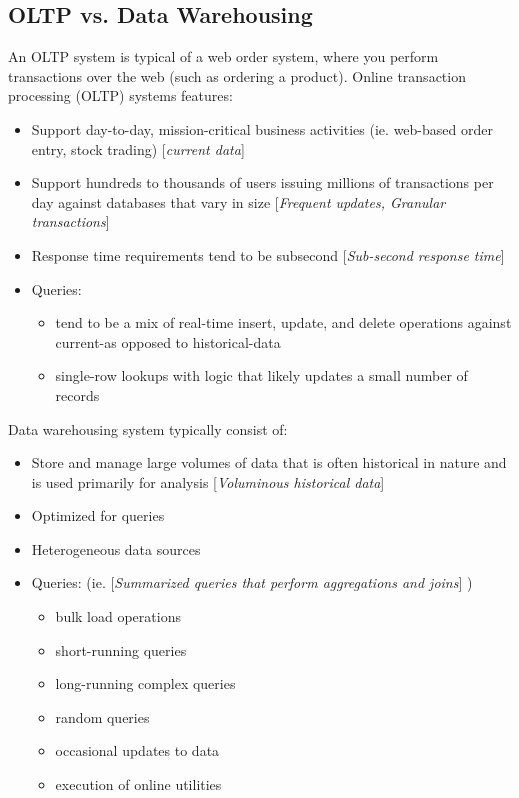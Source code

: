 \documentclass{article}
\begin{document}
\subsection{OLTP vs. Data Warehousing}
\label{oltp vs. data warehousing}

An OLTP system is typical of a web order system, where you perform transactions over the web
(such as ordering a product). Online transaction processing (OLTP) systems features:

\begin{itemize}
\item Support day-to-day, mission-critical business activities (ie. web-based order entry, stock trading)
[\textit{current data}]
\item Support hundreds to thousands of users issuing millions of transactions per day
against databases that vary in size [\textit{Frequent updates, Granular transactions}]
\item Response time requirements tend to be subsecond [\textit{Sub-second response time}]
\item Queries:
\begin{itemize}
\item tend to be a mix of real-time insert, update, and delete
operations against current-as opposed to historical-data
\item single-row lookups with logic that likely updates a small number of records
\end{itemize}
\end{itemize}


Data warehousing system typically consist of:
\begin{itemize}
\item Store and manage large volumes of data that is often historical in nature and is used primarily for
analysis [\textit{Voluminous historical data}]
\item Optimized for queries
\item Heterogeneous data sources
\item Queries: (ie. [\textit{Summarized queries that perform aggregations and joins}] )
\begin{itemize}
\item bulk load operations
\item short-running queries
\item long-running complex queries
\item random queries
\item occasional updates to data
\item execution of online utilities
\end{itemize}

\end{itemize}
\end{document}
